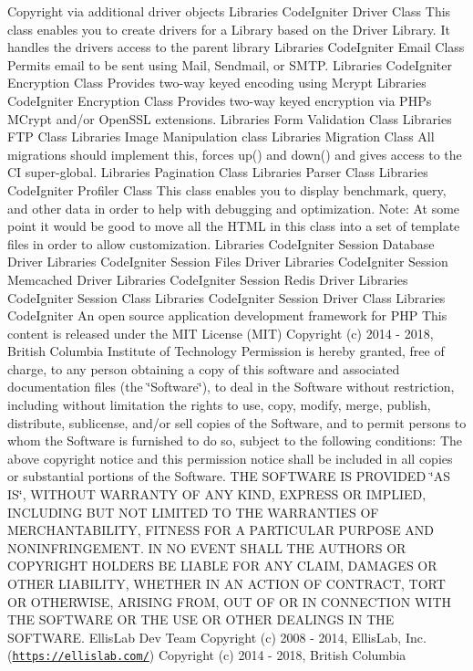 \begin{DoxyCopyright}{Copyright}
via additional driver objects  Libraries Code\+Igniter Driver Class This class enables you to create drivers for a Library based on the Driver Library. It handles the drivers\textquotesingle{} access to the parent library  Libraries Code\+Igniter Email Class Permits email to be sent using Mail, Sendmail, or S\+M\+TP.  Libraries Code\+Igniter Encryption Class Provides two-\/way keyed encoding using Mcrypt  Libraries Code\+Igniter Encryption Class Provides two-\/way keyed encryption via P\+HP\textquotesingle{}s M\+Crypt and/or Open\+S\+SL extensions.  Libraries Form Validation Class  Libraries F\+TP Class  Libraries Image Manipulation class  Libraries Migration Class All migrations should implement this, forces up() and down() and gives access to the CI super-\/global.  Libraries Pagination Class  Libraries Parser Class  Libraries Code\+Igniter Profiler Class This class enables you to display benchmark, query, and other data in order to help with debugging and optimization. Note\+: At some point it would be good to move all the H\+T\+ML in this class into a set of template files in order to allow customization.  Libraries Code\+Igniter Session Database Driver  Libraries Code\+Igniter Session Files Driver  Libraries Code\+Igniter Session Memcached Driver  Libraries Code\+Igniter Session Redis Driver  Libraries Code\+Igniter Session Class  Libraries Code\+Igniter Session Driver Class  Libraries Code\+Igniter An open source application development framework for P\+HP This content is released under the M\+IT License (M\+IT) Copyright (c) 2014 -\/ 2018, British Columbia Institute of Technology Permission is hereby granted, free of charge, to any person obtaining a copy of this software and associated documentation files (the \char`\"{}\+Software\char`\"{}), to deal in the Software without restriction, including without limitation the rights to use, copy, modify, merge, publish, distribute, sublicense, and/or sell copies of the Software, and to permit persons to whom the Software is furnished to do so, subject to the following conditions\+: The above copyright notice and this permission notice shall be included in all copies or substantial portions of the Software. T\+HE S\+O\+F\+T\+W\+A\+RE IS P\+R\+O\+V\+I\+D\+ED \char`\"{}\+A\+S I\+S\char`\"{}, W\+I\+T\+H\+O\+UT W\+A\+R\+R\+A\+N\+TY OF A\+NY K\+I\+ND, E\+X\+P\+R\+E\+SS OR I\+M\+P\+L\+I\+ED, I\+N\+C\+L\+U\+D\+I\+NG B\+UT N\+OT L\+I\+M\+I\+T\+ED TO T\+HE W\+A\+R\+R\+A\+N\+T\+I\+ES OF M\+E\+R\+C\+H\+A\+N\+T\+A\+B\+I\+L\+I\+TY, F\+I\+T\+N\+E\+SS F\+OR A P\+A\+R\+T\+I\+C\+U\+L\+AR P\+U\+R\+P\+O\+SE A\+ND N\+O\+N\+I\+N\+F\+R\+I\+N\+G\+E\+M\+E\+NT. IN NO E\+V\+E\+NT S\+H\+A\+LL T\+HE A\+U\+T\+H\+O\+RS OR C\+O\+P\+Y\+R\+I\+G\+HT H\+O\+L\+D\+E\+RS BE L\+I\+A\+B\+LE F\+OR A\+NY C\+L\+A\+IM, D\+A\+M\+A\+G\+ES OR O\+T\+H\+ER L\+I\+A\+B\+I\+L\+I\+TY, W\+H\+E\+T\+H\+ER IN AN A\+C\+T\+I\+ON OF C\+O\+N\+T\+R\+A\+CT, T\+O\+RT OR O\+T\+H\+E\+R\+W\+I\+SE, A\+R\+I\+S\+I\+NG F\+R\+OM, O\+UT OF OR IN C\+O\+N\+N\+E\+C\+T\+I\+ON W\+I\+TH T\+HE S\+O\+F\+T\+W\+A\+RE OR T\+HE U\+SE OR O\+T\+H\+ER D\+E\+A\+L\+I\+N\+GS IN T\+HE S\+O\+F\+T\+W\+A\+RE.  Ellis\+Lab Dev Team  Copyright (c) 2008 -\/ 2014, Ellis\+Lab, Inc. (\href{https://ellislab.com/}{\tt https\+://ellislab.\+com/})  Copyright (c) 2014 -\/ 2018, British Columbia 
\end{DoxyCopyright}
